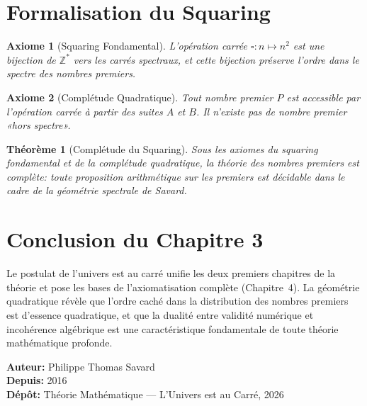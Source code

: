 \documentclass[12pt,a4paper]{article}
\newtheorem{theoreme}{Théorème}
\newtheorem{axiome}{Axiome}
\begin{document}
\section{Formalisation du Squaring}

\begin{axiome}[Squaring Fondamental]
L'opération carrée $\square: n \mapsto n^2$ est une bijection de $\mathbb{Z}^*$
vers les \emph{carrés spectraux}, et cette bijection préserve l'ordre dans le spectre
des nombres premiers.
\end{axiome}

\begin{axiome}[Complétude Quadratique]
Tout nombre premier $P$ est accessible par l'opération carrée à partir des suites
$A$ et $B$. Il n'existe pas de nombre premier «hors spectre».
\end{axiome}

\begin{theoreme}[Complétude du Squaring]
Sous les axiomes du squaring fondamental et de la complétude quadratique, la théorie
des nombres premiers est \emph{complète}: toute proposition arithmétique sur les
premiers est décidable dans le cadre de la géométrie spectrale de Savard.
\end{theoreme}

\section{Conclusion du Chapitre 3}

Le postulat de l'univers est au carré unifie les deux premiers chapitres de la théorie
et pose les bases de l'axiomatisation complète (Chapitre~4). La géométrie quadratique
révèle que l'ordre caché dans la distribution des nombres premiers est d'essence
quadratique, et que la dualité entre validité numérique et incohérence algébrique
est une caractéristique fondamentale de toute théorie mathématique profonde.

\bigskip
\noindent\textbf{Auteur:} Philippe Thomas Savard\\
\noindent\textbf{Depuis:} 2016\\
\noindent\textbf{Dépôt:} Théorie Mathématique — L'Univers est au Carré, 2026
\end{document}

